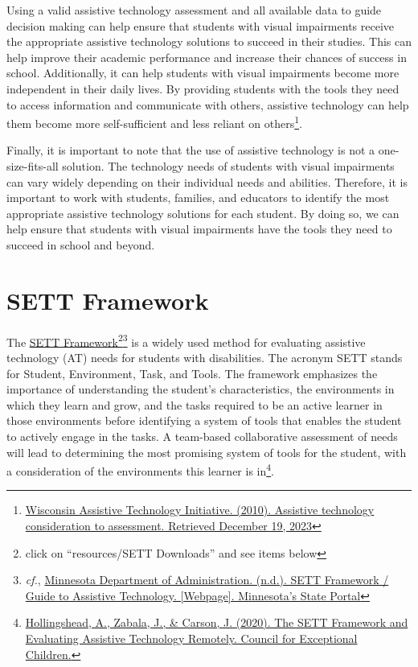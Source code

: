 Using a valid assistive technology assessment and all available data to guide decision making can help ensure that students with visual impairments receive the appropriate assistive technology solutions to succeed in their studies. This can help improve their academic performance and increase their chances of success in school. Additionally, it can help students with visual impairments become more independent in their daily lives. By providing students with the tools they need to access information and communicate with others, assistive technology can help them become more self-sufficient and less reliant on others\footnote{\raggedright \href{https://www.wati.org/free-publications/assistive-technology-consideration-to-assessment/}{Wisconsin Assistive Technology Initiative. (2010). Assistive technology consideration to assessment. Retrieved December 19, 2023}}.

Finally, it is important to note that the use of assistive technology is not a one-size-fits-all solution. The technology needs of students with visual impairments can vary widely depending on their individual needs and abilities. Therefore, it is important to work with students, families, and educators to identify the most appropriate assistive technology solutions for each student. By doing so, we can help ensure that students with visual impairments have the tools they need to succeed in school and beyond.

\section{SETT Framework}\label{trouble41}
The \href{https://www.joyzabala.com/links-resources}{SETT Framework}\footnote{\raggedright click on ``resources/SETT Downloads'' and see items below}\footnote{\raggedright \emph{cf.}, \href{https://mn.gov/admin/at/learning/prek-12/sett-framework.jsp}{Minnesota Department of Administration. (n.d.). SETT Framework / Guide to Assistive Technology. [Webpage]. Minnesota's State Portal}} is a widely used method for evaluating assistive technology (AT) needs for students with disabilities. The acronym SETT stands for Student, Environment, Task, and Tools. The framework emphasizes the importance of understanding the student's characteristics, the environments in which they learn and grow, and the tasks required to be an active learner in those environments before identifying a system of tools that enables the student to actively engage in the tasks. A team-based collaborative assessment of needs will lead to determining the most promising system of tools for the student, with a consideration of the environments this learner is in\footnote{\raggedright \href{https://exceptionalchildren.org/blog/sett-framework-and-evaluating-assistive-technology-remotely}{Hollingshead, A., Zabala, J., \& Carson, J. (2020). The SETT Framework and Evaluating Assistive Technology Remotely. Council for Exceptional Children.}}.

